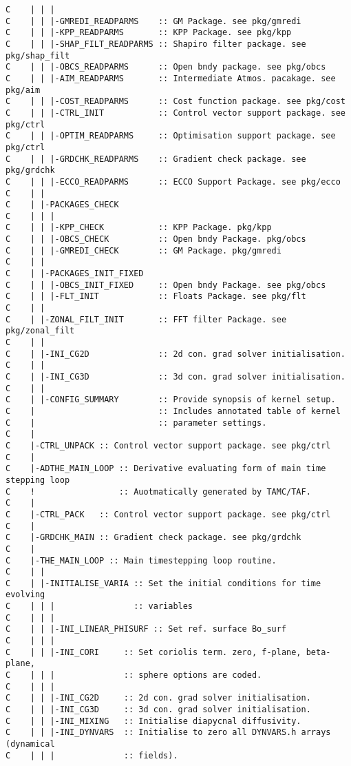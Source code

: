{\begin{verbatim}
C    | | |
C    | | |-GMREDI_READPARMS    :: GM Package. see pkg/gmredi
C    | | |-KPP_READPARMS       :: KPP Package. see pkg/kpp
C    | | |-SHAP_FILT_READPARMS :: Shapiro filter package. see pkg/shap_filt
C    | | |-OBCS_READPARMS      :: Open bndy package. see pkg/obcs
C    | | |-AIM_READPARMS       :: Intermediate Atmos. pacakage. see pkg/aim
C    | | |-COST_READPARMS      :: Cost function package. see pkg/cost
C    | | |-CTRL_INIT           :: Control vector support package. see pkg/ctrl
C    | | |-OPTIM_READPARMS     :: Optimisation support package. see pkg/ctrl 
C    | | |-GRDCHK_READPARMS    :: Gradient check package. see pkg/grdchk
C    | | |-ECCO_READPARMS      :: ECCO Support Package. see pkg/ecco
C    | |
C    | |-PACKAGES_CHECK
C    | | |
C    | | |-KPP_CHECK           :: KPP Package. pkg/kpp
C    | | |-OBCS_CHECK          :: Open bndy Package. pkg/obcs
C    | | |-GMREDI_CHECK        :: GM Package. pkg/gmredi
C    | |
C    | |-PACKAGES_INIT_FIXED
C    | | |-OBCS_INIT_FIXED     :: Open bndy Package. see pkg/obcs
C    | | |-FLT_INIT            :: Floats Package. see pkg/flt
C    | |
C    | |-ZONAL_FILT_INIT       :: FFT filter Package. see pkg/zonal_filt
C    | |
C    | |-INI_CG2D              :: 2d con. grad solver initialisation.
C    | |
C    | |-INI_CG3D              :: 3d con. grad solver initialisation.
C    | |
C    | |-CONFIG_SUMMARY        :: Provide synopsis of kernel setup.
C    |                         :: Includes annotated table of kernel 
C    |                         :: parameter settings.
C    |
C    |-CTRL_UNPACK :: Control vector support package. see pkg/ctrl
C    |
C    |-ADTHE_MAIN_LOOP :: Derivative evaluating form of main time stepping loop
C    !                 :: Auotmatically generated by TAMC/TAF.
C    |
C    |-CTRL_PACK   :: Control vector support package. see pkg/ctrl
C    |
C    |-GRDCHK_MAIN :: Gradient check package. see pkg/grdchk
C    |
C    |-THE_MAIN_LOOP :: Main timestepping loop routine.
C    | |
C    | |-INITIALISE_VARIA :: Set the initial conditions for time evolving 
C    | | |                :: variables
C    | | |
C    | | |-INI_LINEAR_PHISURF :: Set ref. surface Bo_surf
C    | | |
C    | | |-INI_CORI     :: Set coriolis term. zero, f-plane, beta-plane,
C    | | |              :: sphere options are coded.
C    | | |
C    | | |-INI_CG2D     :: 2d con. grad solver initialisation.
C    | | |-INI_CG3D     :: 3d con. grad solver initialisation.
C    | | |-INI_MIXING   :: Initialise diapycnal diffusivity.
C    | | |-INI_DYNVARS  :: Initialise to zero all DYNVARS.h arrays (dynamical
C    | | |              :: fields).

\end{verbatim}}
